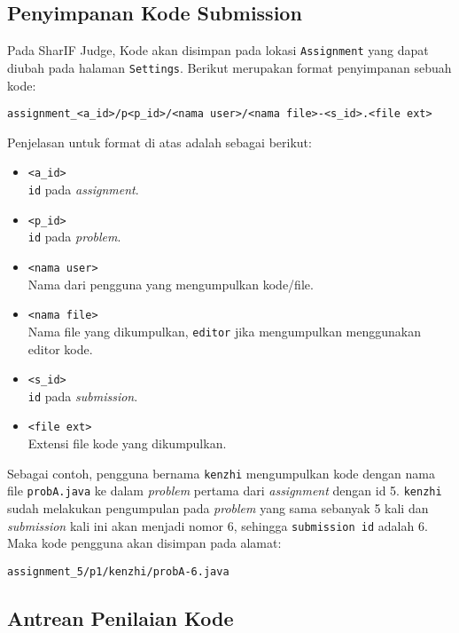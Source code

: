 \subsection{Penyimpanan Kode Submission}
\label{sub:3:1:penyimpanankode}
Pada SharIF Judge, Kode akan disimpan pada lokasi \verb|Assignment| yang dapat diubah pada halaman \verb|Settings|. Berikut merupakan format penyimpanan sebuah kode:

\begin{center}
	\verb|assignment_<a_id>/p<p_id>/<nama user>/<nama file>-<s_id>.<file ext>|
\end{center}

Penjelasan untuk format di atas adalah sebagai berikut:

\begin{itemize}
	\item \verb|<a_id>| \\
	      \verb|id| pada \textit{assignment}.
	\item \verb|<p_id>| \\
	      \verb|id| pada \textit{problem}.
	\item \verb|<nama user>| \\
	      Nama dari pengguna yang mengumpulkan kode/file.
	\item \verb|<nama file>| \\
	      Nama file yang dikumpulkan, \verb|editor| jika mengumpulkan menggunakan editor kode.
	\item \verb|<s_id>| \\
	      \verb|id| pada \textit{submission}.
	\item \verb|<file ext>| \\
	      Extensi file kode yang dikumpulkan.
\end{itemize}

Sebagai contoh, pengguna bernama \verb|kenzhi| mengumpulkan kode dengan nama file \verb|probA.java| ke dalam \textit{problem} pertama dari \textit{assignment} dengan id 5. \verb|kenzhi| sudah melakukan pengumpulan pada \textit{problem} yang sama sebanyak 5 kali dan \textit{submission} kali ini akan menjadi nomor 6, sehingga \verb|submission id| adalah 6. Maka kode pengguna akan disimpan pada alamat:

\begin{center}
	\verb|assignment_5/p1/kenzhi/probA-6.java|
\end{center}

\subsection{Antrean Penilaian Kode}
\label{sub:3:1:antreanpenilaiankode}


